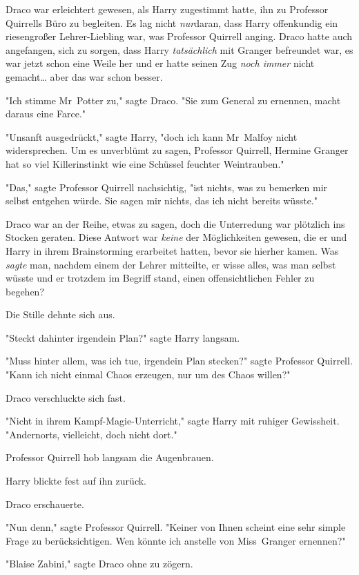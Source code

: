 {Draco war erleichtert gewesen, als Harry zugestimmt hatte, ihn zu Professor Quirrells Büro zu begleiten. Es lag nicht \emph{nur}daran, dass Harry offenkundig ein riesengroßer Lehrer-Liebling war, was Professor Quirrell anging. Draco hatte auch angefangen, sich zu sorgen, dass Harry \emph{tatsächlich} mit Granger befreundet war, es war jetzt schon eine Weile her und er hatte seinen Zug \emph{noch immer} nicht gemacht… aber das war schon besser.

"Ich stimme Mr~Potter zu," sagte Draco. "Sie zum General zu ernennen, macht daraus eine Farce."

"Unsanft ausgedrückt," sagte Harry, "doch ich kann Mr~Malfoy nicht widersprechen. Um es unverblümt zu sagen, Professor Quirrell, Hermine Granger hat so viel Killerinstinkt wie eine Schüssel feuchter Weintrauben."

"Das," sagte Professor Quirrell nachsichtig, "ist nichts, was zu bemerken mir selbst entgehen würde. Sie sagen mir nichts, das ich nicht bereits wüsste."

Draco war an der Reihe, etwas zu sagen, doch die Unterredung war plötzlich ins Stocken geraten. Diese Antwort war \emph{keine} der Möglichkeiten gewesen, die er und Harry in ihrem Brainstorming erarbeitet hatten, bevor sie hierher kamen. Was \emph{sagte} man, nachdem einem der Lehrer mitteilte, er wisse alles, was man selbst wüsste und er trotzdem im Begriff stand, einen offensichtlichen Fehler zu begehen?

Die Stille dehnte sich aus.

"Steckt dahinter irgendein Plan?" sagte Harry langsam.

"Muss hinter allem, was ich tue, irgendein Plan stecken?" sagte Professor Quirrell. "Kann ich nicht einmal Chaos erzeugen, nur um des Chaos willen?"

Draco verschluckte sich fast.

"Nicht in ihrem Kampf-Magie-Unterricht," sagte Harry mit ruhiger Gewissheit. "Andernorts, vielleicht, doch nicht dort."

Professor Quirrell hob langsam die Augenbrauen.

Harry blickte fest auf ihn zurück.

Draco erschauerte.

"Nun denn," sagte Professor Quirrell. "Keiner von Ihnen scheint eine sehr simple Frage zu berücksichtigen. Wen könnte ich anstelle von Miss~Granger ernennen?"

"Blaise Zabini," sagte Draco ohne zu zögern.

}
